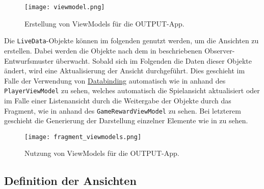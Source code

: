 \begin{figure}[H]
    \texttt{[image: viewmodel.png]}
    \caption{Erstellung von ViewModels für die OUTPUT-App.}\label{fig:viewmodel}
\end{figure}

Die \texttt{LiveData}-Objekte können im folgenden genutzt werden, um die Ansichten zu erstellen. Dabei werden die Objekte nach dem in  beschriebenen Observer-Entwurfsmuster überwacht. Sobald sich im Folgenden die Daten dieser Objekte ändert, wird eine Aktualisierung der Ansicht durchgeführt. Dies geschieht im Falle der Verwendung von \hyperref[subsec:databinding]{Databinding} automatisch wie in  anhand des \texttt{PlayerViewModel} zu sehen, welches automatisch die Spielansicht aktualisiert oder im Falle einer Listenansicht durch die Weitergabe der Objekte durch das Fragment, wie in  anhand des \texttt{GameRewardViewModel} zu sehen. Bei letzterem geschieht die Generierung der Darstellung einzelner Elemente wie in  zu sehen.

\begin{figure}[H]
    \texttt{[image: fragment\_viewmodels.png]}
    \caption{Nutzung von ViewModels für die OUTPUT-App.}\label{fig:fragment_viewmodels}
\end{figure}

\subsection{Definition der Ansichten}\label{subsection:views}

